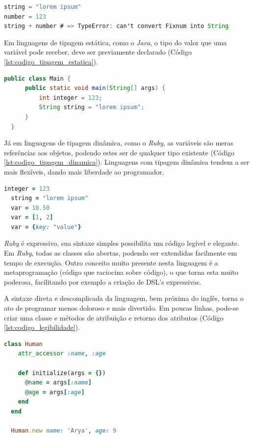 {\singlespace
\begin{lstlisting}[caption=Tipagem forte no \textit{Ruby}, language=Java, label={lst:codigo_tipagem_forte}]
string = "lorem ipsum"
number = 123
string + number # => TypeError: can't convert Fixnum into String
\end{lstlisting}
}

Em linguagens de tipagem estática, como o \textit{Java}, o tipo do valor que uma variável pode receber, deve ser previamente declarado (Código \ref{lst:codigo_tipagem_estatica}).

{\singlespace
\begin{lstlisting}[caption=Tipagem estática no \textit{Java}, language=Java, label={lst:codigo_tipagem_estatica}]
  public class Main {
      public static void main(String[] args) {
          int integer = 123;
          String string = "lorem ipsum";
      }
  }
\end{lstlisting}
}

Já em linguagens de tipagem dinâmica, como o \textit{Ruby}, as variáveis são meras referências aos objetos, podendo estes ser de qualquer tipo existente (Código \ref{lst:codigo_tipagem_dinamica}). Linguagens com tipagem dinâmica tendem a ser mais flexíveis, dando mais liberdade ao programador.

{\singlespace
\begin{lstlisting}[caption=Tipagem dinâmica no \textit{Ruby}, language=Ruby, label={lst:codigo_tipagem_dinamica}]
  integer = 123
  string = "lorem ipsum"
  var = 10.50
  var = [1, 2]
  var = {key: "value"}
\end{lstlisting}
}

\textit{Ruby} é expressivo, sua sintaxe simples possibilita um código legível e elegante. Em \textit{Ruby}, todas as classes são abertas, podendo ser extendidas facilmente em tempo de execução. Outro conceito muito presente nesta linguagem é a metaprogramação (código que raciocina sobre código), o que torna esta muito poderosa, facilitando por exemplo a criação de DSL’s expressivas.

A sintaxe direta e descomplicada da linguagem, bem próxima do inglês, torna o ato de programar menos doloroso e mais divertido. Em poucas linhas, pode-se criar uma classe e métodos de atribuição e retorno dos atributos (Código \ref{lst:codigo_legibilidade}).

{\singlespace
\begin{lstlisting}[caption=Exemplo de legibilidade em código \textit{Ruby}, language=Ruby, label={lst:codigo_legibilidade}]
  class Human
    attr_accessor :name, :age

    def initialize(args = {})
      @name = args[:name]
      @age = args[:age]
    end
  end

  Human.new name: 'Arya', age: 9
\end{lstlisting}
}


